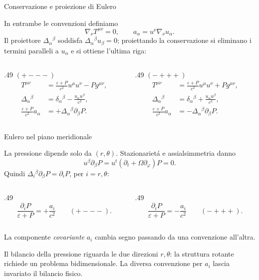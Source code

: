 \begin{frame}[t]{Conservazione e proiezione di Eulero}
\small\raggedright
In entrambe le convenzioni definiamo
\[
\nabla_\nu T^{\mu\nu}=0,\qquad
a_\alpha=u^\nu\nabla_\nu u_\alpha.
\]
Il proiettore $\Delta_\alpha{}^\beta$ soddisfa
$\Delta_\alpha{}^\beta u_\beta=0$; proiettando la conservazione si eliminano
i termini paralleli a $u_\alpha$ e si ottiene l'ultima riga:
\begin{columns}[T,onlytextwidth]
\begin{column}{.49\textwidth}
\centering\textbf{$(+---)$}
\[
\begin{aligned}
T^{\mu\nu}&=\frac{\varepsilon+P}{c^2}u^\mu u^\nu-Pg^{\mu\nu},\\[.6ex]
\Delta_\alpha{}^\beta&=\delta_\alpha{}^\beta-\frac{u_\alpha u^\beta}{c^2},\\[.6ex]
\frac{\varepsilon+P}{c^2}a_\alpha
&=+\Delta_\alpha{}^\beta\partial_\beta P.
\end{aligned}
\]
\end{column}
\begin{column}{.49\textwidth}
\centering\textbf{$(-+++)$}
\[
\begin{aligned}
T^{\mu\nu}&=\frac{\varepsilon+P}{c^2}u^\mu u^\nu+Pg^{\mu\nu},\\[.6ex]
\Delta_\alpha{}^\beta&=\delta_\alpha{}^\beta+\frac{u_\alpha u^\beta}{c^2},\\[.6ex]
\frac{\varepsilon+P}{c^2}a_\alpha
&=-\Delta_\alpha{}^\beta\partial_\beta P.
\end{aligned}
\]
\end{column}
\end{columns}
\par\medskip
\end{frame}


\begin{frame}[t]{Eulero nel piano meridionale}
\small\raggedright
La pressione dipende solo da $(r,\theta)$. Stazionariet\'a e assialsimmetria danno
\[
u^\beta\partial_\beta P=u^t(\partial_t+\Omega\partial_\varphi)P=0.
\]
Quindi $\Delta_i{}^\beta\partial_\beta P=\partial_iP$, per $i=r,\theta$:
\begin{columns}[T,onlytextwidth]
\begin{column}{.49\textwidth}
\[
\boxed{\frac{\partial_iP}{\varepsilon+P}=+\frac{a_i}{c^2}}
\qquad(+---).
\]
\end{column}
\begin{column}{.49\textwidth}
\[
\boxed{\frac{\partial_iP}{\varepsilon+P}=-\frac{a_i}{c^2}}
\qquad(-+++).
\]
\end{column}
\end{columns}
\par\smallskip
La componente \emph{covariante} $a_i$ cambia segno passando da una convenzione all'altra.


\medskip
Il bilancio della pressione riguarda le due direzioni $r,\theta$:
la struttura rotante richiede un problema bidimensionale.
La diversa convenzione per $a_i$ lascia invariato il bilancio fisico.
\end{frame}



